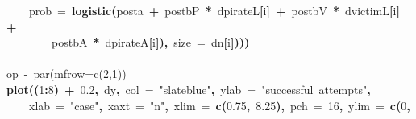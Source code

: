 \documentclass{article}
\makeatletter
\newcommand{\hlnumber}[1]{\textcolor[rgb]{0,0,0}{#1}}%
\newcommand{\hlfunctioncall}[1]{\textcolor[rgb]{.5,0,.33}{\textbf{#1}}}%
\newcommand{\hlstring}[1]{\textcolor[rgb]{.6,.6,1}{#1}}%
\newcommand{\hlkeyword}[1]{\textbf{#1}}%
\newcommand{\hlargument}[1]{\textcolor[rgb]{.69,.25,.02}{#1}}%
\newcommand{\hlcomment}[1]{\textcolor[rgb]{.18,.6,.34}{#1}}%
\newcommand{\hlsymbol}[1]{#1}%
\newcommand{\hlstd}[1]{\textcolor[rgb]{0,0,0}{#1}}%
\newenvironment{kframe}{%
 \def\FrameCommand##1{\hskip\@totalleftmargin \hskip-\fboxsep
 \colorbox{shadecolor}{##1}\hskip-\fboxsep
     \hskip-\linewidth \hskip-\@totalleftmargin \hskip\columnwidth}%
 \MakeFramed {\advance\hsize-\width
   \@totalleftmargin\z@ \linewidth\hsize
   \@setminipage}}%
 {\par\unskip\endMakeFramed}
\newenvironment{knitrout}{}{} %
\makeatother
\begin{document}
\begin{knitrout}
{\begin{kframe}
\begin{flushleft}
\hlstd{}{\ }{\ }{\ }{\ }\hlargument{prob}{\ }\hlargument{=}{\ }\hlfunctioncall{logistic}\hlkeyword{(}\hlsymbol{post}\hlkeyword{\usebox{\hlnormalsizeboxdollar}}\hlsymbol{a}{\ }\hlkeyword{+}{\ }\hlsymbol{post}\hlkeyword{\usebox{\hlnormalsizeboxdollar}}\hlsymbol{bP}{\ }\hlkeyword{*}{\ }\hlsymbol{d}\hlkeyword{\usebox{\hlnormalsizeboxdollar}}\hlsymbol{pirateL}\hlkeyword{[}\hlsymbol{i}\hlkeyword{]}{\ }\hlkeyword{+}{\ }\hlsymbol{post}\hlkeyword{\usebox{\hlnormalsizeboxdollar}}\hlsymbol{bV}{\ }\hlkeyword{*}{\ }\hlsymbol{d}\hlkeyword{\usebox{\hlnormalsizeboxdollar}}\hlsymbol{victimL}\hlkeyword{[}\hlsymbol{i}\hlkeyword{]}{\ }\hlkeyword{+}\hspace*{\fill}\\
\hlstd{}{\ }{\ }{\ }{\ }{\ }{\ }{\ }{\ }\hlsymbol{post}\hlkeyword{\usebox{\hlnormalsizeboxdollar}}\hlsymbol{bA}{\ }\hlkeyword{*}{\ }\hlsymbol{d}\hlkeyword{\usebox{\hlnormalsizeboxdollar}}\hlsymbol{pirateA}\hlkeyword{[}\hlsymbol{i}\hlkeyword{]}\hlkeyword{)}\hlkeyword{,}{\ }\hlargument{size}{\ }\hlargument{=}{\ }\hlsymbol{d}\hlkeyword{\usebox{\hlnormalsizeboxdollar}}\hlsymbol{n}\hlkeyword{[}\hlsymbol{i}\hlkeyword{]}\hlkeyword{)}\hlkeyword{)}\hlkeyword{)}\hspace*{\fill}\\
\hlstd{}\hspace*{\fill}\\
\hlstd{}\hlcomment{\usebox{\hlnormalsizeboxhash}op{\ }\usebox{\hlnormalsizeboxlessthan}-{\ }par(mfrow=c(2,1))}\hspace*{\fill}\\
\hlstd{}\hlfunctioncall{plot}\hlkeyword{(}\hlkeyword{(}\hlnumber{1}\hlkeyword{:}\hlnumber{8}\hlkeyword{)}{\ }\hlkeyword{+}{\ }\hlnumber{0.2}\hlkeyword{,}{\ }\hlsymbol{d}\hlkeyword{\usebox{\hlnormalsizeboxdollar}}\hlsymbol{y}\hlkeyword{,}{\ }\hlargument{col}{\ }\hlargument{=}{\ }\hlstring{"{}slateblue"{}}\hlkeyword{,}{\ }\hlargument{ylab}{\ }\hlargument{=}{\ }\hlstring{"{}successful{\ }attempts"{}}\hlkeyword{,}\hspace*{\fill}\\
\hlstd{}{\ }{\ }{\ }{\ }\hlargument{xlab}{\ }\hlargument{=}{\ }\hlstring{"{}case"{}}\hlkeyword{,}{\ }\hlargument{xaxt}{\ }\hlargument{=}{\ }\hlstring{"{}n"{}}\hlkeyword{,}{\ }\hlargument{xlim}{\ }\hlargument{=}{\ }\hlfunctioncall{c}\hlkeyword{(}\hlnumber{0.75}\hlkeyword{,}{\ }\hlnumber{8.25}\hlkeyword{)}\hlkeyword{,}{\ }\hlargument{pch}{\ }\hlargument{=}{\ }\hlnumber{16}\hlkeyword{,}{\ }\hlargument{ylim}{\ }\hlargument{=}{\ }\hlfunctioncall{c}\hlkeyword{(}\hlnumber{0}\hlkeyword{,}\hspace*{\fill}\\

\end{flushleft}
\end{kframe}}
\end{knitrout}
\end{document}
